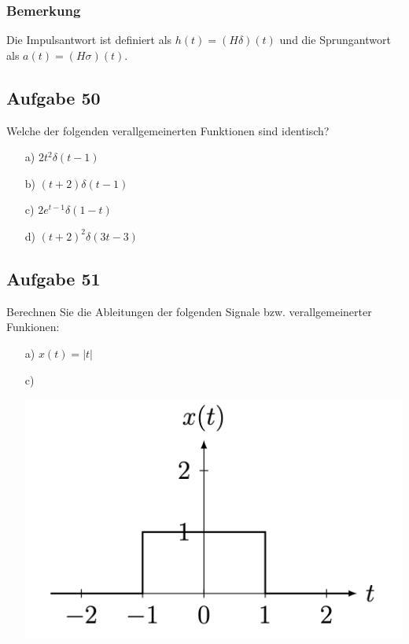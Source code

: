 \documentclass[11pt]{article}
\begin{document}
\vfill \null
\pagebreak

\subsubsection*{Bemerkung}
\vspace*{-0.5cm}
Die Impulsantwort ist definiert als $h(t) = (H \delta)(t)$ und die Sprungantwort als $a(t) = (H\sigma)(t)$.\\
%

\subsection*{Aufgabe 50}
\vspace*{-0.5cm}
Welche der folgenden verallgemeinerten Funktionen sind identisch?
\begin{multicols}{2}
\begin{itemize}
    \item[a)] $2t^2 \delta(t-1)$
    \item[b)] $(t+2)\delta(t-1)$
    \item[c)] $2e^{t-1}\delta(1-t)$
    \item[d)] $(t+2)^2 \delta(3t-3)$
\end{itemize}
\end{multicols}
\vspace*{-0.5cm}

\vspace*{-0.5cm}
\subsection*{Aufgabe 51}
\vspace*{-0.5cm}
Berechnen Sie die Ableitungen der folgenden Signale bzw. verallgemeinerter Funkionen:
\vspace*{-0.5cm}
\begin{itemize}
    \item[a)] $x(t) = |t|$
    \item[c)]
    \item[] \vspace{-0.75cm}\includegraphics[width=0.3\linewidth]{docimgs/51c).png}
\end{itemize}
\end{document}
